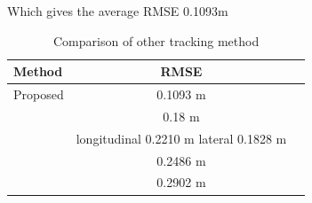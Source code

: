   Which gives the average RMSE 0.1093m


  \begin{table}[h!]
    \begin{center}
      \label{tab:table1}
      \begin{tabular}{l|c|r} %
        \textbf{Method} & \textbf{RMSE} \\
        \hline
        Proposed & 0.1093 m  \\
        \citeauthor{9081940}\cite{9081940} & 0.18 m \\
        \citeauthor{method1}\cite{method1} & longitudinal 0.2210 m lateral 0.1828 m\\
        \citeauthor{8932892}\cite{8932892} & 0.2486 m\\
        \citeauthor{8844649}\cite{8844649} & 0.2902 m \\
        
      \end{tabular}
    \end{center}
    \caption{Comparison of other tracking method}
    \label{tab:method_rmse}
  \end{table}